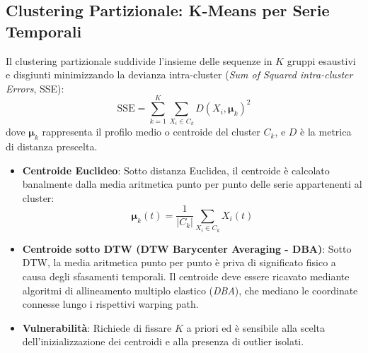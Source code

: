\FloatBarrier
\subsection{Clustering Partizionale: K-Means per Serie Temporali}
\label{subsec:ts-partitional-kmeans}

Il clustering partizionale suddivide l'insieme delle sequenze in $K$ gruppi esaustivi e disgiunti minimizzando la devianza intra-cluster (\textit{Sum of Squared intra-cluster Errors}, SSE):
\begin{equation}
\label{eq:ts-kmeans-sse}
\mathrm{SSE} = \sum_{k=1}^K \sum_{X_i \in C_k} D(X_i, \boldsymbol{\mu}_k)^2
\end{equation}
dove $\boldsymbol{\mu}_k$ rappresenta il profilo medio o centroide del cluster $C_k$, e $D$ \`e la metrica di distanza prescelta.

\begin{itemize}
    \item \textbf{Centroide Euclideo}: Sotto distanza Euclidea, il centroide \`e calcolato banalmente dalla media aritmetica punto per punto delle serie appartenenti al cluster:
    \begin{equation}
    \boldsymbol{\mu}_k(t) = \frac{1}{|C_k|} \sum_{X_i \in C_k} X_i(t)
    \end{equation}
    \item \textbf{Centroide sotto DTW (DTW Barycenter Averaging - DBA)}: Sotto DTW, la media aritmetica punto per punto \`e priva di significato fisico a causa degli sfasamenti temporali. Il centroide deve essere ricavato mediante algoritmi di allineamento multiplo elastico (\textit{DBA}), che mediano le coordinate connesse lungo i rispettivi warping path.
    \item \textbf{Vulnerabilit\`a}: Richiede di fissare $K$ a priori ed \`e sensibile alla scelta dell'inizializzazione dei centroidi e alla presenza di outlier isolati.
\end{itemize}
